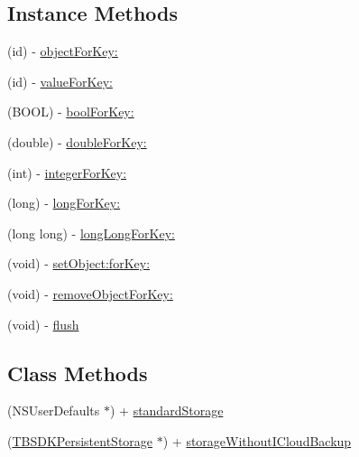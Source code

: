 \subsection*{Instance Methods}
\begin{DoxyCompactItemize}
\item 
(id) -\/ \mbox{\hyperlink{interface_t_b_s_d_k_persistent_storage_a79007c9122f064c775854e8161ee5de3}{object\+For\+Key\+:}}
\item 
(id) -\/ \mbox{\hyperlink{interface_t_b_s_d_k_persistent_storage_abfef5c8d3962720a84582968c846af92}{value\+For\+Key\+:}}
\item 
(B\+O\+OL) -\/ \mbox{\hyperlink{interface_t_b_s_d_k_persistent_storage_ab8957951b2b4dfdb714c8dcf6e96f8f1}{bool\+For\+Key\+:}}
\item 
(double) -\/ \mbox{\hyperlink{interface_t_b_s_d_k_persistent_storage_a7ec6de394bebfd82c2be3900bf4200d6}{double\+For\+Key\+:}}
\item 
(int) -\/ \mbox{\hyperlink{interface_t_b_s_d_k_persistent_storage_a6610ea1709cf51bcac0116e8fa703254}{integer\+For\+Key\+:}}
\item 
(long) -\/ \mbox{\hyperlink{interface_t_b_s_d_k_persistent_storage_ae8c6909144e055dedb959fbfc8035370}{long\+For\+Key\+:}}
\item 
(long long) -\/ \mbox{\hyperlink{interface_t_b_s_d_k_persistent_storage_acc0dddd94544a8502626a2a9dc558f05}{long\+Long\+For\+Key\+:}}
\item 
(void) -\/ \mbox{\hyperlink{interface_t_b_s_d_k_persistent_storage_ab48cb2b970535ed61d6bb3b7f72c88e9}{set\+Object\+:for\+Key\+:}}
\item 
(void) -\/ \mbox{\hyperlink{interface_t_b_s_d_k_persistent_storage_aca64667f8e6fcdede5875e799b14feed}{remove\+Object\+For\+Key\+:}}
\item 
(void) -\/ \mbox{\hyperlink{interface_t_b_s_d_k_persistent_storage_a66db4bca241f33635958d2a57defb42f}{flush}}
\end{DoxyCompactItemize}
\subsection*{Class Methods}
\begin{DoxyCompactItemize}
\item 
(N\+S\+User\+Defaults $\ast$) + \mbox{\hyperlink{interface_t_b_s_d_k_persistent_storage_a674be979bff3817fb759fd0c2a490843}{standard\+Storage}}
\item 
(\mbox{\hyperlink{interface_t_b_s_d_k_persistent_storage}{T\+B\+S\+D\+K\+Persistent\+Storage}} $\ast$) + \mbox{\hyperlink{interface_t_b_s_d_k_persistent_storage_ab9d1dc4f0986214f52ecd0c7f1e34599}{storage\+Without\+I\+Cloud\+Backup}}
\end{DoxyCompactItemize}


